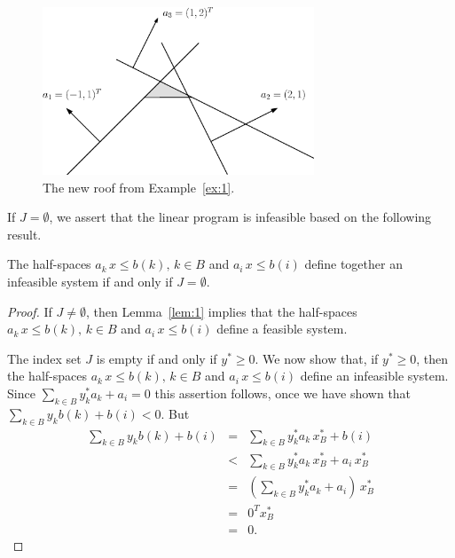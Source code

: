   \begin{figure}[htbp]
    \begin{center}
      
      \includegraphics[height=5cm]{figures/example2.eps} 
      \caption{The new roof from  Example~\ref{ex:1}.} 
      \label{fig:ex:1.2}
    \end{center}
  \end{figure}


\noindent 

{ If $J = \emptyset$, } we assert that the linear program is infeasible based on
the following result. 

\begin{proposition}
  \label{thr:3}
  The half-spaces   $a_k\,x\leq b(k), \,k \in B $ and $a_i\,x\leq b(i)$
  define together an infeasible system 
  if and only   if $J = \emptyset$.
\end{proposition}

\begin{proof}
  
  If $J \neq \emptyset$, then   Lemma~\ref{lem:1} implies that the half-spaces
  $a_k\,x\leq b(k), \,k \in B $ and  $a_i\,x\leq b(i)$ define a feasible system. 

  
  The index set  $J$ is empty if and only if $y^*\geq0$.   
  We now show that, if $y^* \geq 0$, then the half-spaces $a_k\,x\leq b(k), \,k \in B $ and
  $a_i\,x\leq b(i)$ define an infeasible system. 
  Since  $\sum_{k \in B} y^*_k a_k + a_i = 0$  this assertion follows,
  once we have shown that  $\sum_{k \in B} y_k b(k) + b(i) < 0$. But 
  \begin{eqnarray*}
    \sum_{k \in B} y_k b(k) + b(i)  & = & \sum_{k \in B} y^*_k a_k\, x^*_B + b(i)  \\
               & <  & \sum_{k \in B} y^*_k a_k\, x^*_B + a_i\, x^*_B  \\ 
               & = &  \left(\sum_{k \in B} y^*_k a_k + a_i \right)\, x^*_B  \\ 
               & = &  0^T   x_B^* \\
               & = & 0. 
  \end{eqnarray*}
\end{proof}







